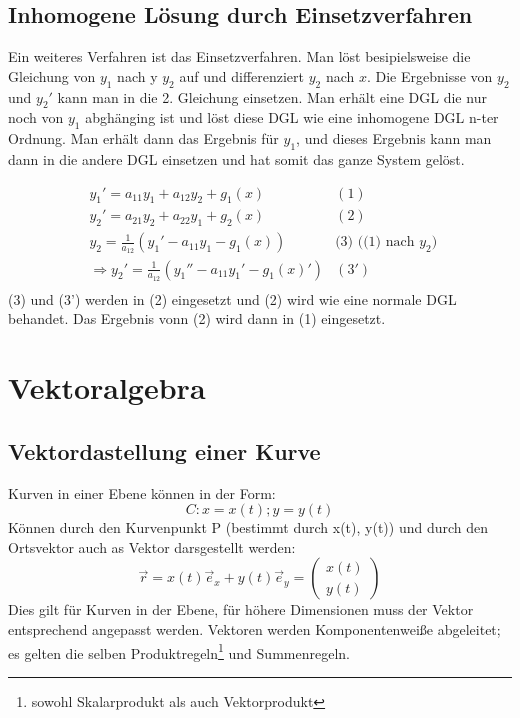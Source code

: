 \documentclass[a4paper,10pt]{scrartcl}
\begin{document}
        \subsection*{Inhomogene Lösung durch Einsetzverfahren}
            Ein weiteres Verfahren ist das Einsetzverfahren. Man löst besipielsweise die Gleichung von \(y_1\) nach y
            \(y_2\) auf und differenziert \(y_2\) nach \(x\). Die Ergebnisse von \(y_2\) und \(y_2'\) kann man in die 2. Gleichung einsetzen.
            Man erhält eine DGL die nur noch von \(y_1\) abghänging ist und löst diese DGL wie eine inhomogene DGL n-ter Ordnung. Man 
            erhält dann das Ergebnis für \(y_1\), und dieses Ergebnis kann man dann in die andere DGL einsetzen und hat somit das ganze System gelöst.
            
            \begin{equation*}
                \begin{aligned}
                    & y_1' = a_{11}y_1 + a_{12}y_2 + g_1(x) &  (1)\\
                    & y_2' = a_{21}y_2 + a_{22}y_1 + g_2(x) &  (2)\\
                    & y_2 = \frac{1}{a_{12}} (y_1' - a_{11}y_1 - g_1(x)) & \text{(3) ((1) nach  \(y_2\)) } \\
                    & \Rightarrow y_2' = \frac{1}{a_{12}} (y_1'' - a_{11}y_1' - g_1(x)') & (3') \\
                \end{aligned}
            \end{equation*}
            (3) und (3') werden in (2) eingesetzt und (2) wird wie eine normale DGL behandet. Das Ergebnis vonn (2) wird dann in (1) eingesetzt.
    
    \section{Vektoralgebra}
        \subsection{Vektordastellung einer Kurve}
        Kurven in einer Ebene können in der Form: 
        \begin{equation*}
            C: x = x(t); y = y(t)
        \end{equation*}
        Können durch den Kurvenpunkt P (bestimmt durch x(t), y(t)) und durch den Ortsvektor auch as Vektor darsgestellt werden:
        \begin{equation*}
            \vec{r} = x(t)\vec{e}_x + y(t)\vec{e}_y = \begin{pmatrix} x(t) \\ y(t) \end{pmatrix}
        \end{equation*}
        Dies gilt für Kurven in der Ebene, für höhere Dimensionen muss der Vektor entsprechend angepasst werden. Vektoren werden Komponentenweiße abgeleitet;
        es gelten die selben Produktregeln\footnote{sowohl Skalarprodukt als auch Vektorprodukt} und Summenregeln. 
\end{document}
